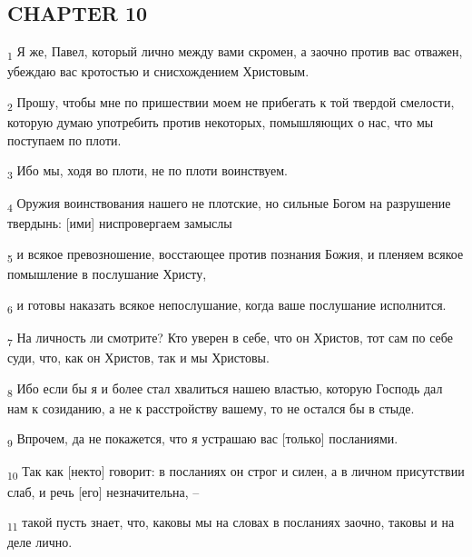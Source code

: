 \subsection{CHAPTER 10}
\begin{tcolorbox}
\textsubscript{1} Я же, Павел, который лично между вами скромен, а заочно против вас отважен, убеждаю вас кротостью и снисхождением Христовым.
\end{tcolorbox}
\begin{tcolorbox}
\textsubscript{2} Прошу, чтобы мне по пришествии моем не прибегать к той твердой смелости, которую думаю употребить против некоторых, помышляющих о нас, что мы поступаем по плоти.
\end{tcolorbox}
\begin{tcolorbox}
\textsubscript{3} Ибо мы, ходя во плоти, не по плоти воинствуем.
\end{tcolorbox}
\begin{tcolorbox}
\textsubscript{4} Оружия воинствования нашего не плотские, но сильные Богом на разрушение твердынь: [ими] ниспровергаем замыслы
\end{tcolorbox}
\begin{tcolorbox}
\textsubscript{5} и всякое превозношение, восстающее против познания Божия, и пленяем всякое помышление в послушание Христу,
\end{tcolorbox}
\begin{tcolorbox}
\textsubscript{6} и готовы наказать всякое непослушание, когда ваше послушание исполнится.
\end{tcolorbox}
\begin{tcolorbox}
\textsubscript{7} На личность ли смотрите? Кто уверен в себе, что он Христов, тот сам по себе суди, что, как он Христов, так и мы Христовы.
\end{tcolorbox}
\begin{tcolorbox}
\textsubscript{8} Ибо если бы я и более стал хвалиться нашею властью, которую Господь дал нам к созиданию, а не к расстройству вашему, то не остался бы в стыде.
\end{tcolorbox}
\begin{tcolorbox}
\textsubscript{9} Впрочем, да не покажется, что я устрашаю вас [только] посланиями.
\end{tcolorbox}
\begin{tcolorbox}
\textsubscript{10} Так как [некто] говорит: в посланиях он строг и силен, а в личном присутствии слаб, и речь [его] незначительна, --
\end{tcolorbox}
\begin{tcolorbox}
\textsubscript{11} такой пусть знает, что, каковы мы на словах в посланиях заочно, таковы и на деле лично.
\end{tcolorbox}
